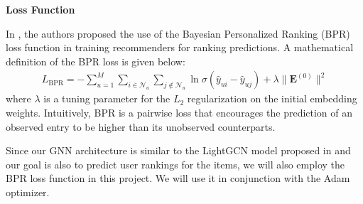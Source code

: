\documentclass{article}
\begin{document}
\textbf{Loss Function} \label{bpr_loss}

In \cite{lightgcn}, the authors proposed the use of the Bayesian Personalized Ranking (BPR) loss function in training recommenders for ranking predictions. A mathematical definition of the BPR loss is given below:
\begin{align*}
    L_{\mbox{BPR}} = - \sum_{u = 1}^M \sum_{i \in \mathcal{N}_u} \sum_{j \notin \mathcal{N}_u} \ln \sigma(\hat{y}_{ui} - \hat{y}_{uj}) + \lambda \| \mathbf{E}^{(0)} \|^2
\end{align*}
where $\lambda$ is a tuning parameter for the $L_2$ regularization on the initial embedding weights. Intuitively, BPR is a pairwise loss that encourages the prediction of an observed entry to be higher than its unobserved counterparts.

Since our GNN architecture is similar to the LightGCN model proposed in \cite{lightgcn} and our goal is also to predict user rankings for the items, we will also employ the BPR loss function in this project. We will use it in conjunction with the Adam \cite{adam} optimizer.





\end{document}
